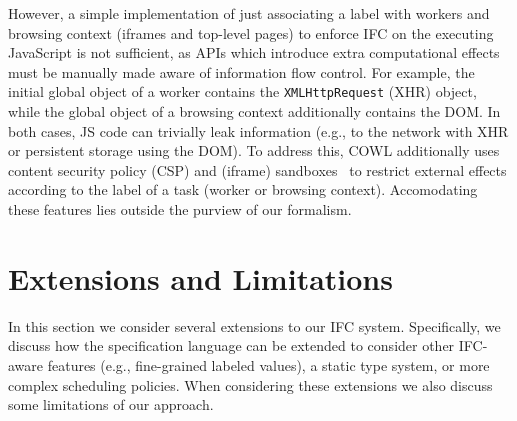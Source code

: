 \documentclass{sigplanconf}
\newcommand{\Red}[1]{{\color{red} #1}}
\newcommand{\tocite}[1]{\Red{\cite{#1}}}
\begin{document}
However, a simple implementation of just associating a label with
workers and browsing context (iframes and top-level pages) to enforce
IFC on the executing JavaScript is not sufficient, as APIs which
introduce extra computational effects must be manually made aware of information flow
control.
%
For example, the initial global object of a worker contains the
\texttt{XMLHttpRequest} (XHR) object, while the global object of a
browsing context additionally contains the DOM.
%
In both cases, JS code can trivially leak information (e.g., to the
network with XHR or persistent storage using the DOM).
%
To address this, COWL additionally uses content security policy (CSP) and
(iframe) sandboxes~\cite{csp1.1,html5} to restrict external effects according
to the label of a task (worker or browsing context).  Accomodating these
features lies outside the purview of our formalism.

\section{Extensions and Limitations}
\label{sec:extensions}

In this section we consider several extensions to our IFC system.
%
Specifically, we discuss how the specification language can be
extended to consider other IFC-aware features (e.g., fine-grained
labeled values), a static type system, or more complex scheduling
policies.
%
When considering these extensions we also discuss some limitations
of our approach.
\end{document}
